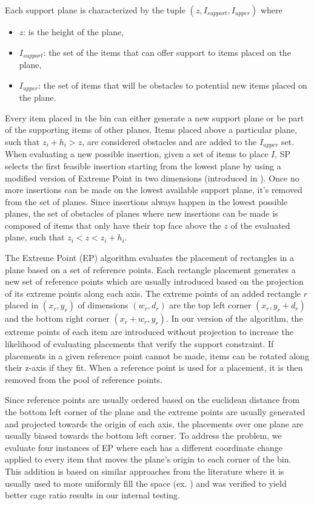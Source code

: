 Each support plane is characterized by the tuple $(z, I_{support}, I_{upper})$ where
\begin{itemize}
    \item $z$: is the height of the plane,
    \item $I_{support}$: the set of the items that can offer support to items placed on the plane,
    \item $I_{upper}$: the set of items that will be obstacles to potential new items placed on the plane.
\end{itemize}

Every item placed in the bin can either generate a new support plane or be part of the supporting items of other planes. 
Items placed above a particular plane, such that $z_i + h_i > z$, are considered obstacles and are added to the $I_{upper}$ set.
When evaluating a new possible insertion, given a set of items to place $I$, SP selects the first feasible insertion starting from the lowest plane by using a modified version of Extreme Point in two dimensions (introduced in \cite{crainic2008extreme}).
Once no more insertions can be made on the lowest available support plane, it's removed from the set of planes.
Since insertions always happen in the lowest possible planes, the set of obstacles of planes where new insertions can be made is composed of items that only have their top face above the $z$ of the evaluated plane, such that $z_i < z < z_i + h_i$.

The Extreme Point (EP) algorithm evaluates the placement of rectangles in a plane based on a set of reference points. 
Each rectangle placement generates a new set of reference points which are usually introduced based on the projection of its extreme points along each axis.
The extreme points of an added rectangle $r$ placed in $(x_r, y_r)$ of dimensions $(w_r, d_r)$ are the top left corner $(x_r, y_r + d_r)$ and the bottom right corner $(x_r + w_r, y_r)$.
In our version of the algorithm, the extreme points of each item are introduced without projection to increase the likelihood of evaluating placements that verify the support constraint.
If placements in a given reference point cannot be made, items can be rotated along their z-axis if they fit.
When a reference point is used for a placement, it is then removed from the pool of reference points.

Since reference points are usually ordered based on the euclidean distance from the bottom left corner of the plane and the extreme points are usually generated and projected towards the origin of each axis, the placements over one plane are usually biased towards the bottom left corner.
To address the problem, we evaluate four instances of EP where each has a different coordinate change applied to every item that moves the plane's origin to each corner of the bin.
This addition is based on similar approaches from the literature where it is usually used to more uniformly fill the space (ex. \citeauthor{GAJDA2022102559}) and was verified to yield better cage ratio results in our internal testing.

